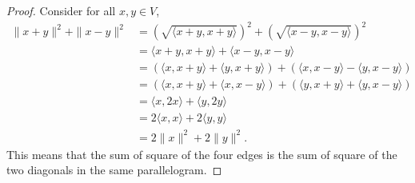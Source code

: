 \begin{Exercise}
\begin{proof}
Consider for all $x,y\in V$,
\begin{align*}
\| x+y \|^2 + \| x-y \|^2
&= \left(\sqrt{\langle x+y, x+y \rangle}\right)^2 + \left(\sqrt{\langle x-y, x-y \rangle}\right)^2 \\
&= \langle x+y, x+y \rangle + \langle x-y, x-y \rangle \\
&= (\langle x,x+y \rangle + \langle y,x+y \rangle) + (\langle x,x-y \rangle - \langle y,x-y \rangle) \\
&= (\langle x,x+y \rangle + \langle x, x-y \rangle) + (\langle y,x+y \rangle + \langle y,x-y \rangle) \\
&= \langle x,2x \rangle + \langle y,2y \rangle \\
&= 2\langle x,x \rangle + 2\langle y,y \rangle \\
&= 2\|x\|^2 + 2\|y\|^2.
\end{align*}
This means that the sum of square of the four edges is
the sum of square of the two diagonals in the same parallelogram.
\end{proof}
\end{Exercise}